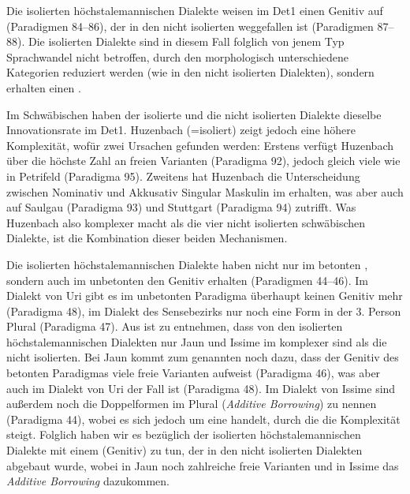 Die isolierten höchstalemannischen Dialekte weisen im Det1 einen Genitiv auf (Paradigmen 84–86), der in den nicht isolierten weggefallen ist (Paradigmen 87–88). Die isolierten Dialekte sind in diesem Fall folglich von jenem Typ Sprachwandel nicht betroffen, durch den morphologisch unterschiedene Kategorien reduziert werden (wie in den nicht isolierten Dialekten), sondern erhalten einen .

Im Schwäbischen haben der isolierte und die nicht isolierten Dialekte dieselbe Innovationsrate im Det1. Huzenbach (=isoliert) zeigt jedoch eine höhere Komplexität, wofür zwei Ursachen gefunden werden: Erstens verfügt Huzenbach über die höchste Zahl an freien Varianten (Paradigma 92), jedoch gleich viele wie in Petrifeld (Paradigma 95). Zweitens hat Huzenbach die Unterscheidung zwischen Nominativ und Akkusativ Singular Maskulin im  erhalten, was aber auch auf Saulgau (Paradigma 93) und Stuttgart (Paradigma 94) zutrifft. Was Huzenbach also komplexer macht als die vier nicht isolierten schwäbischen Dialekte, ist die Kombination dieser beiden Mechanismen.

Die isolierten höchstalemannischen Dialekte haben nicht nur im betonten , sondern auch im unbetonten den Genitiv erhalten (Paradigmen 44–46). Im Dialekt von Uri gibt es im unbetonten Paradigma überhaupt keinen Genitiv mehr (Paradigma 48), im Dialekt des Sensebezirks nur noch eine Form in der 3. Person Plural (Paradigma 47). Aus  ist zu entnehmen, dass von den isolierten höchstalemannischen Dialekten nur Jaun und Issime im  komplexer sind als die nicht isolierten. Bei Jaun kommt zum genannten  noch dazu, dass der Genitiv des betonten Paradigmas viele freie Varianten aufweist (Paradigma 46), was aber auch im Dialekt von Uri der Fall ist (Paradigma 48). Im Dialekt von Issime sind außerdem noch die Doppelformen im Plural (\textit{Additive Borrowing}) zu nennen (Paradigma 44), wobei es sich jedoch um eine  handelt, durch die die Komplexität steigt. Folglich haben wir es bezüglich der isolierten höchstalemannischen Dialekte mit einem  (Genitiv) zu tun, der in den nicht isolierten Dialekten abgebaut wurde, wobei in Jaun noch zahlreiche freie Varianten und in Issime das \textit{Additive Borrowing} dazukommen.

